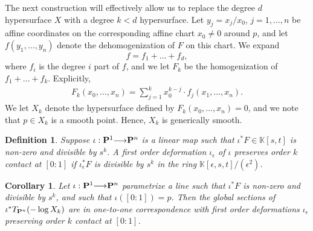 \documentclass[12pt,reqno]{amsart}
\theoremstyle{plain}
\newtheorem{corollary}[theorem]{Corollary}
\newtheorem{definition}[theorem]{Definition}
\theoremstyle{remark}
\numberwithin{equation}{section}
\renewcommand{\k}{k}
\renewcommand{\to}{{\longrightarrow}}
\renewcommand {\P}{{\bf P}}
\numberwithin{equation}{section}
\renewcommand{\k}{\mathbb K}
\begin{document}
The next construction will effectively allow us
to replace the degree $d$ hypersurface $X$ with a degree $k<d$
hypersurface. Let $y_j = x_j/x_0$, $j=1, \ldots, n$ be affine
coordinates on the corresponding affine chart $x_0 \neq 0$ around $p$,
and let $f(y_1, \ldots, y_n)$ denote the dehomogenization of $F$ on
this chart.  We expand
$$f= f_1 + \ldots + f_d,$$ where $f_i$ is the degree $i$ part of $f$,
and we let $F_k$ be the homogenization of $f_1 + \ldots + f_k$.
Explicitly,
\begin{align}
  F_k(x_0, \ldots, x_n) = \sum_{j=1}^{k}x_{0}^{k-j}\cdot f_{j}(x_1, \ldots, x_n).
\end{align}
We let $X_k$ denote the hypersurface defined by
$F_k(x_0, \ldots, x_n)=0$, and we note that $p \in X_{k}$ is a smooth
point.  Hence, $X_k$ is generically smooth.

\begin{definition}
  \label{definition:preservecontact}
  Suppose $\iota: \P^{1} \to \P^{n}$ is a linear map such that
  $\iota^{*}F \in \k[s,t]$ is non-zero and divisible by $s^{k}$. A
  first order deformation $\iota_{\epsilon}$ of $\iota$
  \emph{preserves order $k$ contact at $[0:1]$} if
  $\iota_{\epsilon}^{*}F$ is divisible by $s^{k}$ in the ring
  $\k[\epsilon,s,t]/(\epsilon^{2})$.
\end{definition}



\begin{corollary}
  \label{corollary:ktangent} Let $\iota: \P^{1} \to \P^{n}$
  parametrize a line such that $\iota^{*}F$ is non-zero and divisible
  by $s^{k}$, and such that $\iota([0:1])=p$. Then the global sections
  of $\iota^{*}T_{\P^{n}}(- \log X_k)$ are in one-to-one
  correspondence with first order deformations $\iota_{\epsilon}$
  preserving order $k$ contact at $[0:1]$.
\end{corollary}
\end{document}

